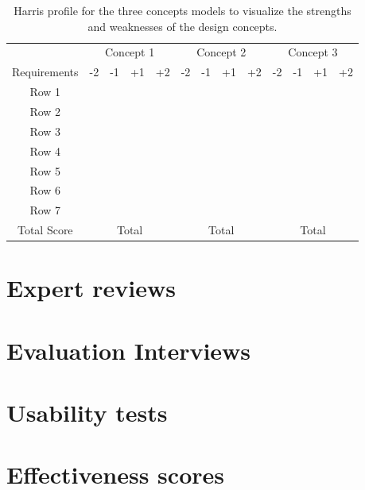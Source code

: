 \begin{appendices}
\begin{table}[h]
    \centering
    \begin{tabularx}{\textwidth}{|c|*{12}{X|}}
        \hline
        & \multicolumn{4}{c|}{Concept 1} & \multicolumn{4}{c|}{Concept 2} & \multicolumn{4}{c|}{Concept 3} \\
        \cline{2-13}
        Requirements & -2 & -1 & +1 & +2 & -2 & -1 & +1 & +2 & -2 & -1 & +1 & +2 \\
        \hline
        Row 1 & & & & & & & & & & & & \\
        \hline
        Row 2 & & & & & & & & & & & & \\
        \hline
        Row 3 & & & & & & & & & & & & \\
        \hline
        Row 4 & & & & & & & & & & & & \\
        \hline
        Row 5 & & & & & & & & & & & & \\
        \hline
        Row 6 & & & & & & & & & & & & \\
        \hline
        Row 7 & & & & & & & & & & & & \\
        \hline
        Total Score & \multicolumn{4}{c|}{Total} & \multicolumn{4}{c|}{Total} & \multicolumn{4}{c|}{Total} \\
        \hline
    \end{tabularx}
    \caption{Harris profile for the three concepts models to visualize the strengths and weaknesses of the design concepts.}
    \label{tab:requirements_table}
\end{table}

\section{Expert reviews}
\label{appendix:expert}

\section{Evaluation Interviews}
\label{appendix:evaluation}

\section{Usability tests}
\label{appendix:usability}

\section{Effectiveness scores}
\label{appendix:effectiveness}


\end{appendices}
